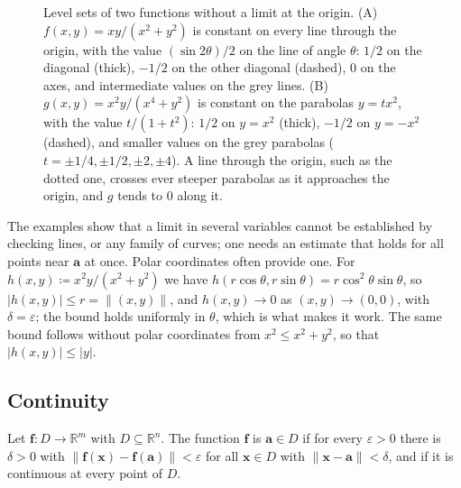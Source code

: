 \begin{figure}
{}
\caption{Level sets of two functions without a limit at the origin. (A) $f(x,y)=xy/(x^2+y^2)$ is constant on every line through the origin, with the value $(\sin2\theta)/2$ on the line of angle $\theta$: $1/2$ on the diagonal (thick), $-1/2$ on the other diagonal (dashed), $0$ on the axes, and intermediate values on the grey lines. (B) $g(x,y)=x^2y/(x^4+y^2)$ is constant on the parabolas $y=tx^2$, with the value $t/(1+t^2)$: $1/2$ on $y=x^2$ (thick), $-1/2$ on $y=-x^2$ (dashed), and smaller values on the grey parabolas ($t=\pm1/4,\pm1/2,\pm2,\pm4$). A line through the origin, such as the dotted one, crosses ever steeper parabolas as it approaches the origin, and $g$ tends to $0$ along it.}
\label{fig:path-limits}
\end{figure}

The examples show that a limit in several variables cannot be established by checking lines, or any family of curves; one needs an estimate that holds for all points near $\mathbf a$ at once. Polar coordinates often provide one. For $h(x,y)\coloneqq x^2y/(x^2+y^2)$ we have $h(r\cos\theta,r\sin\theta)=r\cos^2\theta\sin\theta$, so $|h(x,y)|\le r=\|(x,y)\|$, and $h(x,y)\to0$ as $(x,y)\to(0,0)$, with $\delta=\varepsilon$; the bound holds uniformly in $\theta$, which is what makes it work. The same bound follows without polar coordinates from $x^2\le x^2+y^2$, so that $|h(x,y)|\le|y|$.

\subsection{Continuity}

\begin{definition}[Continuity]
\label{def:continuity-rn}
Let $\mathbf f\colon D\to\mathbb R^m$ with $D\subseteq\mathbb R^n$. The function $\mathbf f$ is  $\mathbf a\in D$ if for every $\varepsilon>0$ there is $\delta>0$ with $\|\mathbf f(\mathbf x)-\mathbf f(\mathbf a)\|<\varepsilon$ for all $\mathbf x\in D$ with $\|\mathbf x-\mathbf a\|<\delta$, and  if it is continuous at every point of $D$.
\end{definition}

